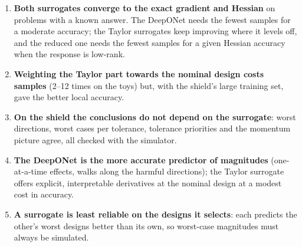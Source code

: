 \documentclass[11pt,a4paper]{article}
\begin{document}
\begin{enumerate}
  \item \textbf{Both surrogates converge to the exact gradient and Hessian} on problems with a
        known answer. The DeepONet needs the fewest samples for a moderate accuracy; the Taylor
        surrogates keep improving where it levels off, and the reduced one needs the fewest samples
        for a given Hessian accuracy when the response is low-rank.
  \item \textbf{Weighting the Taylor part towards the nominal design costs samples} (2--12 times
        on the toys) but, with the shield's large training set, gave the better local accuracy.
  \item \textbf{On the shield the conclusions do not depend on the surrogate}: worst directions,
        worst cases per tolerance, tolerance priorities and the momentum picture agree, all checked
        with the simulator.
  \item \textbf{The DeepONet is the more accurate predictor of magnitudes} (one-at-a-time effects,
        walks along the harmful directions); the Taylor surrogate offers explicit, interpretable
        derivatives at the nominal design at a modest cost in accuracy.
  \item \textbf{A surrogate is least reliable on the designs it selects}: each predicts the other's
        worst designs better than its own, so worst-case magnitudes must always be simulated.
\end{enumerate}
\end{document}
